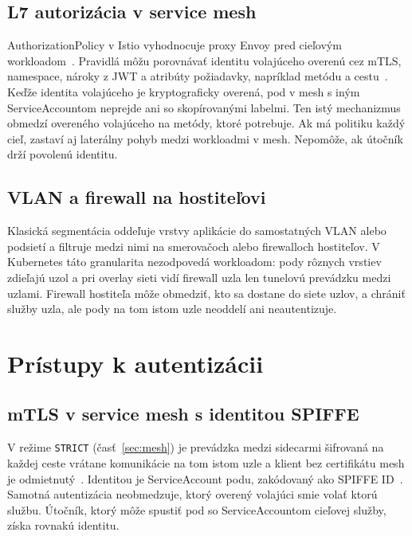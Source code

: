 \subsection{L7 autorizácia v service mesh}

AuthorizationPolicy v Istio vyhodnocuje proxy Envoy pred cieľovým workloadom~\cite{istio-authorizationpolicy}. Pravidlá môžu porovnávať identitu volajúceho overenú cez mTLS, namespace, nároky z JWT a atribúty požiadavky, napríklad metódu a cestu~\cite{istio-security}. Keďže identita volajúceho je kryptograficky overená, pod v mesh s iným ServiceAccountom neprejde ani so skopírovanými labelmi. Ten istý mechanizmus obmedzí overeného volajúceho na metódy, ktoré potrebuje. Ak má politiku každý cieľ, zastaví aj laterálny pohyb medzi workloadmi v mesh. Nepomôže, ak útočník drží povolenú identitu.

\subsection{VLAN a firewall na hostiteľovi}

Klasická segmentácia oddeľuje vrstvy aplikácie do samostatných VLAN alebo podsietí a filtruje medzi nimi na smerovačoch alebo firewalloch hostiteľov. V Kubernetes táto granularita nezodpovedá workloadom: pody rôznych vrstiev zdieľajú uzol a pri overlay sieti vidí firewall uzla len tunelovú prevádzku medzi uzlami. Firewall hostiteľa môže obmedziť, kto sa dostane do siete uzlov, a chrániť služby uzla, ale pody na tom istom uzle neoddelí ani neautentizuje.

\section{Prístupy k autentizácii}
\label{sec:authentication}

\subsection{mTLS v service mesh s identitou SPIFFE}

V režime \texttt{STRICT} (časť~\ref{sec:mesh}) je prevádzka medzi sidecarmi šifrovaná na každej ceste vrátane komunikácie na tom istom uzle a klient bez certifikátu mesh je odmietnutý~\cite{istio-security}. Identitou je ServiceAccount podu, zakódovaný ako SPIFFE ID~\cite{istio-spire,spiffe-id}. Samotná autentizácia neobmedzuje, ktorý overený volajúci smie volať ktorú službu. Útočník, ktorý môže spustiť pod so ServiceAccountom cieľovej služby, získa rovnakú identitu.

